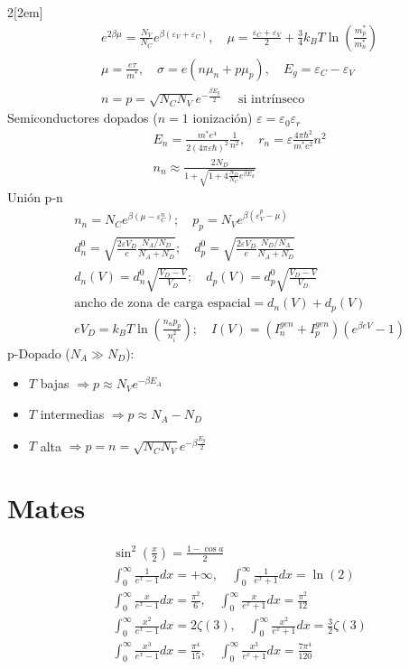 \documentclass[leqno]{article}
\begin{document}
\begin{multicols}{2}[\columnsep2em]
\begin{align*}
& e ^{2\beta \mu } = \frac{N_V}{N_C} e ^{\beta (\varepsilon _V + \varepsilon _C)}, \quad
\mu  = \frac{\varepsilon _C+\varepsilon _V}{2} + \frac{3}{4}k_BT\ln\left( \frac{m_p^*}{m_n^*} \right) \\
& \mu = \frac{e\tau }{m^*}, \quad \sigma  = e(n\mu _n+ p\mu _p), \quad E_g = \varepsilon _C-\varepsilon _V\\
& n = p = \sqrt{N_CN_V}e ^{-\frac{\beta E_g}{2}} \quad \text{ si intrínseco}
\end{align*}
Semiconductores dopados ($n=1$ ionización) $\varepsilon = \varepsilon _0\varepsilon_r$
\begin{align*}
  &E_n = \frac{m^*e^4}{2(4\pi \varepsilon \hbar )^2} \frac{1}{n^2}, \quad r_n = \varepsilon \frac{4\pi \hbar ^2}{m^*e^2}n^2\\
  &n_n \approx \frac{2N_D}{1+\sqrt{1+4 \frac{N_D}{N_C} e ^{\beta E_d} }} 
\end{align*}
Unión p-n
\begin{align*}
  &n_n = N_C e ^{\beta (\mu -\varepsilon _C^n)}; \quad p_p = N_V e ^{\beta (\varepsilon _V^p-\mu )}\\
  &d^0_n = \sqrt{ \frac{2\varepsilon V_D}{e} \frac{N_A / N_D}{N_A+N_D}}; \quad d_p^0 = \sqrt{\frac{2\varepsilon V_D}{e}\frac{N_D / N_A}{N_A+N_D}} \\
  & d_n(V) = d_n^0 \sqrt{\frac{V_D-V}{V_D}}; \quad d_p(V) = d_p^0 \sqrt{\frac{V_D-V}{V_D}}\\
  &\text{ancho de zona de carga espacial} = d_n(V)+d_p(V)\\
  &eV_D=k_BT\ln\left( \frac{n_np_p}{n^2_i}\right); \quad I(V) = (I_n ^{gen} +I_p ^{gen})(e ^{\beta eV}-1)
\end{align*}
p-Dopado ($N_A\gg N_D$):
\begin{itemize}[topsep=-6pt, itemsep=0pt]
  \item $T$ bajas  $\Rightarrow p\approx N_Ve ^{-\beta E_A}$
  \item $T$ intermedias  $\Rightarrow p\approx N_A-N_D $
  \item $T$ alta  $\Rightarrow p=n = \sqrt{N_CN_V}e ^{-\beta \frac{E_g}{2}} $
\end{itemize}



\section{Mates}
\begin{align*}
&\sin^2 \left(\frac{x}{2}\right) = \frac{1-\cos a}{2}\\
&\int_0^\infty \frac{1}{e^x-1}dx = +\infty, \quad \int_0^\infty \frac{1}{e^x+1}dx = \ln(2)\\
&\int_0^\infty \frac{x}{e^x-1}dx = \frac{\pi^2}{6}, \quad \int_0^\infty \frac{x}{e^x+1}dx = \frac{\pi^2}{12} \\
&\int_0^\infty \frac{x^2}{e^x-1}dx = 2\zeta(3), \quad \int_0^\infty \frac{x^2}{e^x+1}dx = \frac{3}{2}\zeta(3)\\
&\int_0^\infty \frac{x^3}{e^x-1}dx = \frac{\pi^4}{15}, \quad \int_0^\infty \frac{x^3}{e^x+1}dx = \frac{7\pi^4}{120} 
\end{align*}

\end{multicols}
\end{document}
